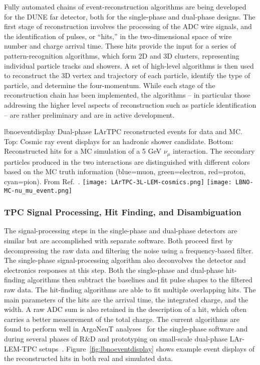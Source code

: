 Fully automated chains of event-reconstruction algorithms
are being developed for the DUNE far detector, both for the single-phase and dual-phase designs.
The first stage of reconstruction involves the processing of the
ADC wire signals, and the identification of pulses, or ``hits,'' in the 
two-dimensional space of wire number and charge arrival time. 
These hits provide the input for a series of pattern-recognition algorithms,
which form 2D and 3D clusters, representing individual particle tracks and showers.
A set of high-level algorithms is then used to reconstruct the 
3D vertex and trajectory of each particle, identify the type of particle, and determine the four-momentum.
While each stage of the reconstruction chain has been implemented, the algorithms -- in
particular those addressing the higher level aspects of reconstruction such as particle identification -- are
rather preliminary and are in active development.


\begin{cdrfigure}{lbnoeventdisplay}
{
Dual-phase LArTPC reconstructed events for data and MC.
Top: Cosmic ray event displays for an hadronic shower candidate.
Bottom: Reconstructed hits for a MC simulation of a 5 GeV $\nu_{\mu}$ interaction.
The secondary particles produced in the two interactions are 
distinguished with different colors based on the MC truth information (blue=muon, green=electron, red=proton, cyan=pion).
From Ref.~\cite{Badertscher:2012dq}.
}
\texttt{[image: LArTPC-3L-LEM-cosmics.png]}
\texttt{[image: LBNO-MC-nu\_mu\_event.png]}
\end{cdrfigure}

\subsubsection{TPC Signal Processing, Hit Finding, and Disambiguation}

The signal-processing steps in the single-phase and dual-phase detectors are similar but
are accomplished with separate software.  Both proceed first by decompressing the raw data
and filtering the noise using a frequency-based filter.  The single-phase signal-processing
algorithm also deconvolves the detector and electronics responses at this step.
Both the single-phase and dual-phase hit-finding algorithms then subtract the baselines
and fit pulse shapes to the filtered raw data.  The hit-finding algorithms are able to
fit multiple overlapping hits.  The main parameters of the hits are the arrival time, the
integrated charge, and the width.  A raw ADC sum is also retained in the description of a hit, which
often carries a better measurement of the total charge.
The current algorithms are found to perform well in 
ArgoNeuT analyses~\cite{Anderson:2012vc} for the single-phase software and during several phases 
of R$\&$D and prototyping on small-scale dual-phase LAr-LEM-TPC 
setups~\cite{Badertscher:2008rf,Badertscher:2012dq}.
Figure~\ref{fig:lbnoeventdisplay} shows example event displays of the reconstructed hits 
in both real and simulated data. 

